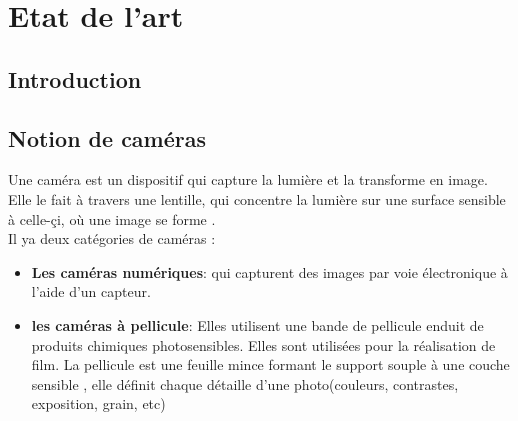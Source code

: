 

\chapter{Etat de l'art} %

\label{Chapter1} %


\newcommand{\keyword}[1]{\textbf{#1}}
\newcommand{\tabhead}[1]{\textbf{#1}}
\newcommand{\code}[1]{\texttt{#1}}
\newcommand{\file}[1]{\texttt{\bfseries#1}}
\newcommand{\option}[1]{\texttt{\itshape#1}}



\section{Introduction}




\newpage
\section{Notion de caméras}

Une caméra est un dispositif qui capture la lumière et la transforme en image. Elle le fait à travers une lentille, qui concentre la lumière sur une surface sensible à celle-çi, où une image se forme \cite{noauthor_quest-ce_nodate}. \\

 Il ya deux catégories de caméras :
 \begin{itemize}
 	\item \textbf{Les caméras numériques}: qui capturent des images par voie électronique à l’aide d’un capteur.
 	\item\textbf{les caméras à pellicule}: Elles utilisent une bande de pellicule enduit de produits chimiques photosensibles. Elles sont utilisées pour la réalisation de film.
 	La pellicule est une feuille mince formant le support souple à une couche sensible , elle définit chaque détaille d'une photo(couleurs, contrastes, exposition, grain, etc)\\
 \end{itemize}
 
